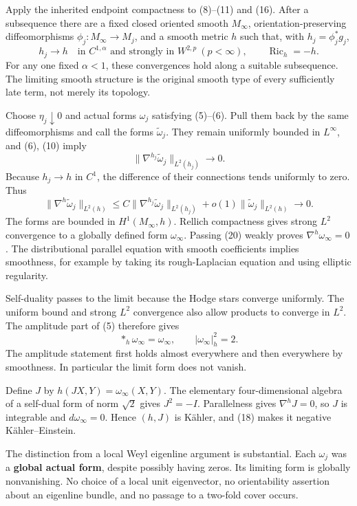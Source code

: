 \documentclass[
  11pt,
]{article}
\begin{document}
Apply the inherited endpoint compactness to (8)--(11) and (16). After a
subsequence there are a fixed closed oriented smooth \(M_\infty\),
orientation-preserving diffeomorphisms \(\phi_j:M_\infty\to M_j\), and a
smooth metric \(h\) such that, with \(h_j=\phi_j^*g_j\), \[
 h_j\longrightarrow h\quad\text{in }C^{1,\alpha}
         \text{ and strongly in }W^{2,p}\ (p<\infty),
 \qquad\operatorname{Ric}_h=-h.
 \tag{18}
\] For any one fixed \(\alpha<1\), these convergences hold along a
suitable subsequence. The limiting smooth structure is the original
smooth type of every sufficiently late term, not merely its topology.

Choose \(\eta_j\downarrow0\) and actual forms \(\omega_j\) satisfying
(5)--(6). Pull them back by the same diffeomorphisms and call the forms
\(\widetilde\omega_j\). They remain uniformly bounded in \(L^\infty\),
and (6), (10) imply \[
                  \|\nabla^{h_j}\widetilde\omega_j\|_{L^2(h_j)}
                                   \longrightarrow0.
 \tag{19}
\] Because \(h_j\to h\) in \(C^1\), the difference of their connections
tends uniformly to zero. Thus \[
 \|\nabla^h\widetilde\omega_j\|_{L^2(h)}
 \le C\|\nabla^{h_j}\widetilde\omega_j\|_{L^2(h_j)}
       +o(1)\|\widetilde\omega_j\|_{L^2(h)}\longrightarrow0.
 \tag{20}
\] The forms are bounded in \(H^1(M_\infty,h)\). Rellich compactness
gives strong \(L^2\) convergence to a globally defined form
\(\omega_\infty\). Passing (20) weakly proves
\(\nabla^h\omega_\infty=0\). The distributional parallel equation with
smooth coefficients implies smoothness, for example by taking its
rough-Laplacian equation and using elliptic regularity.

Self-duality passes to the limit because the Hodge stars converge
uniformly. The uniform bound and strong \(L^2\) convergence also allow
products to converge in \(L^2\). The amplitude part of (5) therefore
gives \[
                      *_h\omega_\infty=\omega_\infty,
                 \qquad |\omega_\infty|_h^2=2.
 \tag{21}
\] The amplitude statement first holds almost everywhere and then
everywhere by smoothness. In particular the limit form does not vanish.

Define \(J\) by \(h(JX,Y)=\omega_\infty(X,Y)\). The elementary
four-dimensional algebra of a self-dual form of norm \(\sqrt2\) gives
\(J^2=-I\). Parallelness gives \(\nabla^hJ=0\), so \(J\) is integrable
and \(d\omega_\infty=0\). Hence \((h,J)\) is Kähler, and (18) makes it
negative Kähler--Einstein.

The distinction from a local Weyl eigenline argument is substantial.
Each \(\omega_j\) was a \textbf{global actual form}, despite possibly
having zeros. Its limiting form is globally nonvanishing. No choice of a
local unit eigenvector, no orientability assertion about an eigenline
bundle, and no passage to a two-fold cover occurs.
\end{document}
